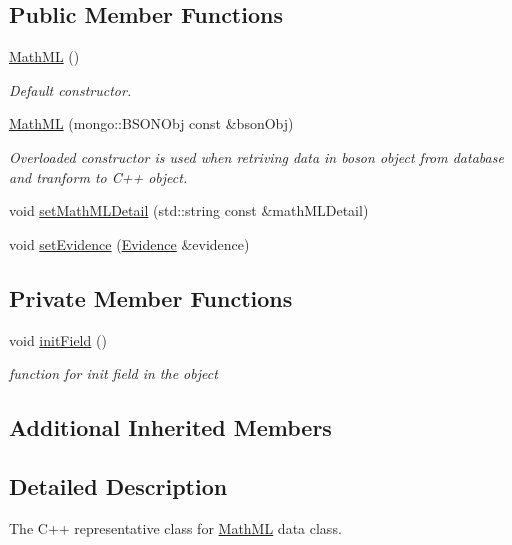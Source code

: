 \subsection*{Public Member Functions}
\begin{DoxyCompactItemize}
\item 
\hyperlink{classunisys_1_1MathML_ab8c80f595da327fc0c15d6e53736ea6e}{Math\-M\-L} ()
\begin{DoxyCompactList}\small\item\em Default constructor. \end{DoxyCompactList}\item 
\hyperlink{classunisys_1_1MathML_af27ed98e6685300b38ffb6f45a7eb39c}{Math\-M\-L} (mongo\-::\-B\-S\-O\-N\-Obj const \&bson\-Obj)
\begin{DoxyCompactList}\small\item\em Overloaded constructor is used when retriving data in boson object from database and tranform to C++ object. \end{DoxyCompactList}\item 
void \hyperlink{classunisys_1_1MathML_a6fa262d496ae5b8353771bbe60f566a3}{set\-Math\-M\-L\-Detail} (std\-::string const \&math\-M\-L\-Detail)
\item 
void \hyperlink{classunisys_1_1MathML_a266b926ed02c7cb6061d50f55e1d2cd4}{set\-Evidence} (\hyperlink{classunisys_1_1Evidence}{Evidence} \&evidence)
\end{DoxyCompactItemize}
\subsection*{Private Member Functions}
\begin{DoxyCompactItemize}
\item 
void \hyperlink{classunisys_1_1MathML_a51e1fc565fb5ad24ca6557a8db6551d0}{init\-Field} ()
\begin{DoxyCompactList}\small\item\em function for init field in the object \end{DoxyCompactList}\end{DoxyCompactItemize}
\subsection*{Additional Inherited Members}


\subsection{Detailed Description}
The C++ representative class for \hyperlink{classunisys_1_1MathML}{Math\-M\-L} data class. 

